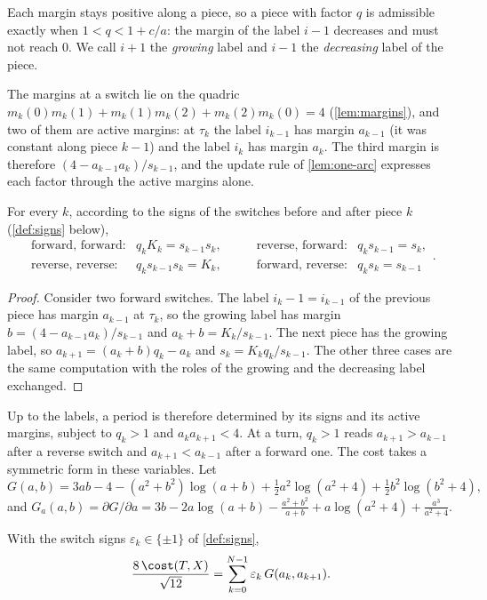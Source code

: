 Each margin stays positive along a piece, so a piece with factor $q$ is admissible exactly when
$1<q<1+c/a$: the margin of the label $i-1$ decreases and must not reach $0$. We call $i+1$ the
\emph{growing} label and $i-1$ the \emph{decreasing} label of the piece.

The margins at a switch lie on the quadric $m_k(0)m_k(1)+m_k(1)m_k(2)+m_k(2)m_k(0)=4$
(\cref{lem:margins}), and two of them are active margins: at $\tau_k$ the label $i_{k-1}$ has
margin $a_{k-1}$ (it was constant along piece $k-1$) and the label $i_k$ has margin $a_k$. The
third margin is therefore $(4-a_{k-1}a_k)/s_{k-1}$, and the update rule of \cref{lem:one-arc}
expresses each factor through the active margins alone.

\begin{lemma}\label{lem:per-factors}
For every $k$, according to the signs of the switches before and after piece $k$
(\cref{def:signs} below),
\[
  \begin{array}{llll}
    \text{forward, forward:} & q_kK_k=s_{k-1}s_k, &\qquad
    \text{reverse, forward:} & q_ks_{k-1}=s_k,\\[2pt]
    \text{reverse, reverse:} & q_ks_{k-1}s_k=K_k, &\qquad
    \text{forward, reverse:} & q_ks_k=s_{k-1}
  \end{array}.
\]
\end{lemma}

\begin{proof}
Consider two forward switches. The label $i_k-1=i_{k-1}$ of the previous piece has margin
$a_{k-1}$ at $\tau_k$, so the growing label has margin $b=(4-a_{k-1}a_k)/s_{k-1}$ and
$a_k+b=K_k/s_{k-1}$. The next piece has the growing label, so
$a_{k+1}=(a_k+b)q_k-a_k$ and $s_k=K_kq_k/s_{k-1}$. The other three cases are the same
computation with the roles of the growing and the decreasing label exchanged.
\end{proof}

Up to the labels, a period is therefore determined by its signs and its active margins, subject
to $q_k>1$ and $a_ka_{k+1}<4$. At a turn, $q_k>1$ reads $a_{k+1}>a_{k-1}$ after a reverse switch
and $a_{k+1}<a_{k-1}$ after a forward one. The cost takes a symmetric form in these variables.
Let
\[
  G(a,b)=3ab-4-(a^2+b^2)\log(a+b)+\tfrac12a^2\log(a^2+4)+\tfrac12b^2\log(b^2+4),
\]
and
$G_a(a,b)=\partial G/\partial a
=3b-2a\log(a+b)-\frac{a^2+b^2}{a+b}+a\log(a^2+4)+\frac{a^3}{a^2+4}$.

\begin{lemma}\label{lem:per-signed-action}
With the switch signs $\varepsilon_k\in\{\pm1\}$ of \cref{def:signs},
\[
  \frac{8\,\cost(T,X)}{\sqrt{12}}=\sum_{k=0}^{N-1}\varepsilon_k\,G(a_k,a_{k+1}).
\]
\end{lemma}

